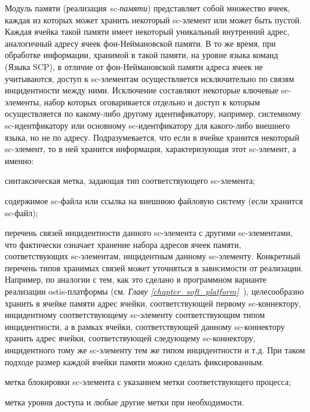 \begin{textitemize}
	\item Модуль памяти (реализация \textit{sc-памяти}) представляет собой множество ячеек, каждая из которых может хранить некоторый sc-элемент или может быть пустой. Каждая ячейка такой памяти имеет некоторый уникальный внутренний адрес, аналогичный адресу ячеек фон-Неймановской памяти. В то же время, при обработке информации, хранимой в такой памяти, на уровне языка команд (Языка SCP), в отличие от фон-Неймановской памяти адреса ячеек не учитываются, доступ к sc-элементам осуществляется исключительно по связям инцидентности между ними. Исключение составляют некоторые ключевые sc-элементы, набор которых оговаривается отдельно и доступ к которым осуществляется по какому-либо другому идентификатору, например, системному sc-идентфикатору или основному sc-идентфикатору для какого-либо внешнего языка, но не по адресу. 
	Подразумевается, что если в ячейке хранится некоторый sc-элемент, то в ней хранится информация, характеризующая этот sc-элемент, а именно:
	\begin{textitemize}
		\item синтаксическая метка, задающая тип соответствующего sc-элемента;
		\item содержимое sc-файла или ссылка на внешнюю файловую систему (если хранится sc-файл);
		\item перечень связей инцидентности данного sc-элемента с другими sc-элементами, что фактически означает хранение набора адресов ячеек памяти, соответствующих sc-элементам, инцидентным данному sc-элементу. Конкретный перечень типов хранимых связей может уточняться в зависимости от реализации. Например, по аналогии с тем, как это сделано в программном варианте реализации ostis-платформы (см. \textit{Главу \ref{chapter_soft_platform}~}), целесообразно хранить в ячейке памяти адрес ячейки, соответствующей первому sc-коннектору, инцидентному соответствующему sc-элементу соответствующим типом инцидентности, а в рамках ячейки, соответствующей данному sc-коннектору хранить адрес ячейки, соответствующей следующему sc-коннектору, инцидентного тому же sc-элементу тем же типом инцидентности и т.д. При таком подходе размер каждой ячейки памяти можно сделать фиксированным.
		\item метка блокировки sc-элемента с указанием метки соответствующего процесса;
		\item метка уровня доступа и любые другие метки при необходимости.
	\end{textitemize}

\end{textitemize}
